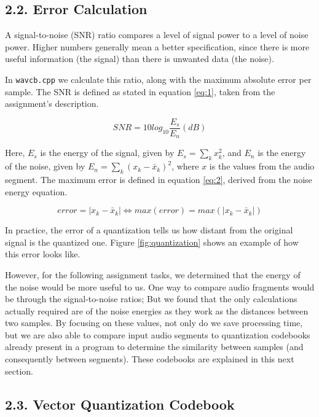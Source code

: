 \documentclass[12pt]{article}
\begin{document}
\newpage
\subsection*{2.2. Error Calculation}

A signal-to-noise (SNR) ratio compares a level of signal power to a level of 
noise power. 
Higher numbers generally mean a better specification, since there is more useful 
information (the signal) than there is unwanted data (the noise).

In \texttt{wavcb.cpp} we calculate this ratio, along with the maximum absolute 
error per sample. The SNR is defined as stated in equation \ref{eq:1}, taken 
from the assignment's description.

\begin{equation} \label{eq:1}
  SNR = 10 log_{10} \frac{E_{s}}{E_{n}} (dB)
\end{equation}

Here, $E_s$ is the energy of the signal, given by $E_s = \sum_{k} x_k^2$, and
$E_n$ is the energy of the noise, given by $E_n = \sum_{k} (x_k-\bar{x}_k)^2$,
where $x$ is the values from the audio segment.
The maximum error is defined in equation \ref{eq:2}, derived from the noise 
energy equation.

\begin{equation} \label{eq:2}
  error = |x_k-\bar{x}_k| \Leftrightarrow 
  max(error) = max(|x_k-\bar{x}_k|)
\end{equation}

In practice, the error of a quantization tells us how distant from the original
signal is the quantized one.
Figure \ref{fig:quantization} shows an example of how this error looks like.

However, for the following assignment tasks, we determined that the energy of
the noise would be more useful to us.
One way to compare audio fragments would be through the signal-to-noise ratios;
But we found that the only calculations actually required are of the noise 
energies as they work as the distances between two samples.
By focusing on these values, not only do we save processing time, but we are
also able to compare input audio segments to quantization codebooks already 
present in a program to determine the similarity between samples (and 
consequently between segments). These codebooks are explained in this next section.

\subsection*{2.3. Vector Quantization Codebook}
\label{sec:vctQuantCB}
\end{document}

